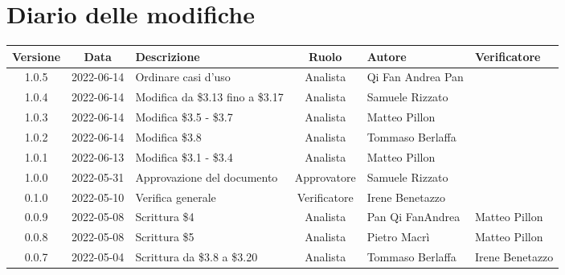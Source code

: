 \section*{Diario delle modifiche}
	\begin{center}
	\renewcommand{\arraystretch}{1.8} %
	\begin{longtable}{ |c|c|p{8em}|c|m{5em}|m{5em}| }
	\hline
	\textbf{Versione} & \textbf{Data} & \textbf{Descrizione} &  \textbf{Ruolo} &  \textbf{Autore} & \textbf{Verificatore}\\ %
	\hline
	1.0.5 & 2022-06-14 & Ordinare casi d'uso  & Analista & Qi Fan Andrea	\newline Pan & \\
	\hline
	1.0.4 & 2022-06-14 & Modifica da \$3.13 \newline fino a \$3.17 & Analista & Samuele	\newline Rizzato & \\
	\hline
	1.0.3 & 2022-06-14 & Modifica \newline \$3.5 - \$3.7 & Analista & Matteo	\newline Pillon & \\
  	\hline
	1.0.2 & 2022-06-14 & Modifica \newline \$3.8 & Analista & Tommaso	\newline Berlaffa & \\
  	\hline
	1.0.1 & 2022-06-13 & Modifica \newline \$3.1 - \$3.4 & Analista & Matteo	\newline Pillon & \\
	\hline
	1.0.0 & 2022-05-31 & Approvazione del documento & Approvatore & Samuele \newline Rizzato & \\
	\hline
	0.1.0 & 2022-05-10 & Verifica generale & Verificatore & Irene \newline Benetazzo & \\
	\hline
    0.0.9 & 2022-05-08 & Scrittura \$4 & Analista & Pan Qi Fan\newline Andrea & Matteo \newline Pillon\\
	\hline
    0.0.8 & 2022-05-08 & Scrittura \$5 & Analista & Pietro \newline Macrì & Matteo \newline Pillon\\
	\hline
    0.0.7 & 2022-05-04 & Scrittura \newline da \$3.8 a \$3.20 & Analista & Tommaso \newline Berlaffa & Irene \newline Benetazzo\\

\end{longtable}
\end{center}
